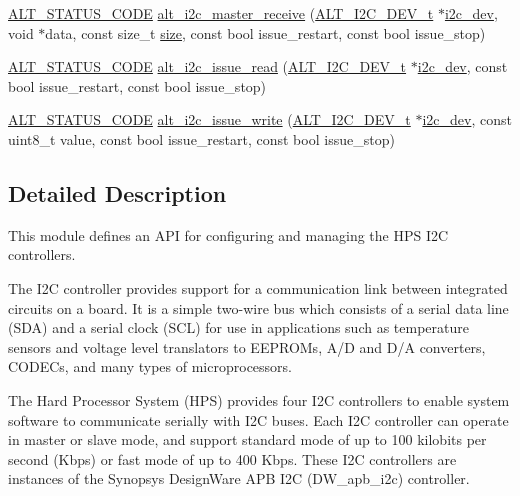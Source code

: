\begin{DoxyCompactItemize}
\item 
\mbox{\hyperlink{hwlib_8h_abdb0d369f069723ca55d6c94bcaaaa12}{A\+L\+T\+\_\+\+S\+T\+A\+T\+U\+S\+\_\+\+C\+O\+DE}} \mbox{\hyperlink{group__ALT__I2C_gab0663c3f923ca348dc16b5f4a4f96f9b}{alt\+\_\+i2c\+\_\+master\+\_\+receive}} (\mbox{\hyperlink{structALT__I2C__DEV__s}{A\+L\+T\+\_\+\+I2\+C\+\_\+\+D\+E\+V\+\_\+t}} $\ast$\mbox{\hyperlink{structi2c__dev}{i2c\+\_\+dev}}, void $\ast$data, const size\+\_\+t \mbox{\hyperlink{sun4u_2tte_8h_a245260f6f74972558f61b85227df5aae}{size}}, const bool issue\+\_\+restart, const bool issue\+\_\+stop)
\item 
\mbox{\hyperlink{hwlib_8h_abdb0d369f069723ca55d6c94bcaaaa12}{A\+L\+T\+\_\+\+S\+T\+A\+T\+U\+S\+\_\+\+C\+O\+DE}} \mbox{\hyperlink{group__ALT__I2C_gad3dbad0b53d35273f476b2c9c6284fae}{alt\+\_\+i2c\+\_\+issue\+\_\+read}} (\mbox{\hyperlink{structALT__I2C__DEV__s}{A\+L\+T\+\_\+\+I2\+C\+\_\+\+D\+E\+V\+\_\+t}} $\ast$\mbox{\hyperlink{structi2c__dev}{i2c\+\_\+dev}}, const bool issue\+\_\+restart, const bool issue\+\_\+stop)
\item 
\mbox{\hyperlink{hwlib_8h_abdb0d369f069723ca55d6c94bcaaaa12}{A\+L\+T\+\_\+\+S\+T\+A\+T\+U\+S\+\_\+\+C\+O\+DE}} \mbox{\hyperlink{group__ALT__I2C_ga25b161ac5d073c8f1ba5ad3bb822b951}{alt\+\_\+i2c\+\_\+issue\+\_\+write}} (\mbox{\hyperlink{structALT__I2C__DEV__s}{A\+L\+T\+\_\+\+I2\+C\+\_\+\+D\+E\+V\+\_\+t}} $\ast$\mbox{\hyperlink{structi2c__dev}{i2c\+\_\+dev}}, const uint8\+\_\+t value, const bool issue\+\_\+restart, const bool issue\+\_\+stop)
\end{DoxyCompactItemize}


\subsection{Detailed Description}
This module defines an A\+PI for configuring and managing the H\+PS I2C controllers.

The I2C controller provides support for a communication link between integrated circuits on a board. It is a simple two-\/wire bus which consists of a serial data line (S\+DA) and a serial clock (S\+CL) for use in applications such as temperature sensors and voltage level translators to E\+E\+P\+R\+O\+Ms, A/D and D/A converters, C\+O\+D\+E\+Cs, and many types of microprocessors.

The Hard Processor System (H\+PS) provides four I2C controllers to enable system software to communicate serially with I2C buses. Each I2C controller can operate in master or slave mode, and support standard mode of up to 100 kilobits per second (Kbps) or fast mode of up to 400 Kbps. These I2C controllers are instances of the Synopsys Design\+Ware A\+PB I2C (D\+W\+\_\+apb\+\_\+i2c) controller.

